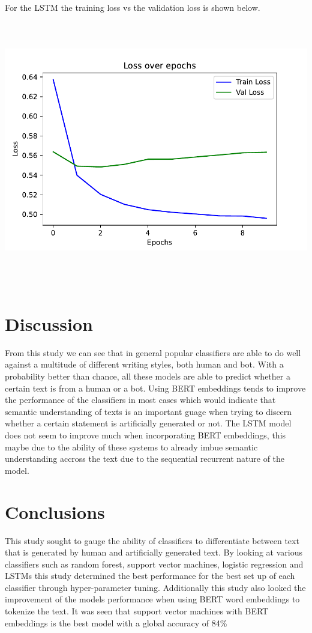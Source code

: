 \documentclass[12pt]{article}
\begin{document}
 For the LSTM the training loss vs the validation loss is shown below.
\\ \includegraphics[width=16cm, height=12cm]{bert_loss}\\

\section{Discussion}
From this study we can see that in general popular classifiers are able to do well against a multitude of different writing styles, both human and bot. With a probability better than chance, all these models are able to predict whether a certain text is from a human or a bot. Using BERT embeddings tends to improve the performance of the classifiers in most cases which would indicate that semantic understanding of texts is an important guage when trying to discern whether a certain statement is artificially generated or not. The LSTM model does not seem to improve much when incorporating BERT embeddings, this maybe due to the ability of these systems to already imbue semantic understanding accross the text due to the sequential recurrent nature of the model.

\section{Conclusions}
This study sought to gauge the ability of classifiers to differentiate between text that is generated by human and artificially generated text. By looking at various classifiers such as random forest, support vector machines, logistic regression and LSTMs  this study determined the best performance for the best set up of each classifier through hyper-parameter tuning. Additionally this study also looked the improvement of the models performance when using BERT word embeddings to tokenize the text. It was seen that support vector machines with BERT embeddings is the best model with a global accuracy of 84\%  


\end{document}
